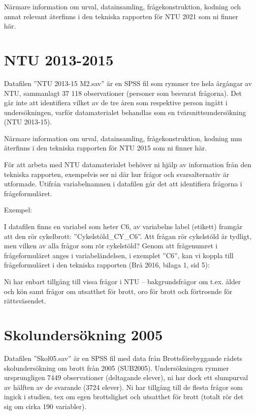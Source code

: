 \documentclass[
]{book}
\begin{document}
Närmare information om urval, datainsamling, frågekonstruktion, kodning och annat relevant återfinns i den
tekniska rapporten för NTU 2021 som ni finner här.

\hypertarget{ntu-2013-2015}{%
\section{NTU 2013-2015}\label{ntu-2013-2015}}

Datafilen ''NTU 2013-15 M2.sav'' är en SPSS fil som rymmer tre hela årgångar av NTU,
sammanlagt 37 118 observationer (personer som besvarat frågorna). Det går inte att identifiera
vilket av de tre åren som respektive person ingått i undersökningen, varför datamaterialet
behandlas som en tvärsnittsundersökning (NTU 2013-15).

Närmare information om urval, datainsamling, frågekonstruktion, kodning mm återfinns i den
tekniska rapporten för NTU 2015 som ni finner här.

För att arbeta med NTU datamaterialet behöver ni hjälp av information från den tekniska
rapporten, exempelvis ser ni där hur frågor och svarsalternativ är utformade.
Utifrån variabelnamnen i datafilen går det att identifiera frågorna i frågeformuläret.

Exempel:

I datafilen finns en variabel som heter C6, av variabelns label (etikett) framgår att den rör
cykelbrott: ''Cykelstöld\_CY\_C6''. Att frågan rör cykelstöld är tydligt, men vilken av alla frågor
som rör cykelstöld? Genom att frågenumret i frågeformuläret anges i variabeländelsen, i
exemplet ''C6'', kan vi koppla till frågeformuläret i den tekniska rapporten (Brå 2016, bilaga 1,
sid 5):

Ni har enbart tillgång till vissa frågor i NTU -- bakgrundsfrågor om t.ex. ålder och kön samt
frågor om utsatthet för brott, oro för brott och förtroende för rättsväsendet.

\hypertarget{skolundersuxf6kning-2005}{%
\section{Skolundersökning 2005}\label{skolundersuxf6kning-2005}}

Datafilen ''Skol05.sav'' är en SPSS fil med data från Brottsförebyggande rådets
skolundersökning om brott från 2005 (SUB2005). Undersökningen rymmer ursprungligen 7449
observationer (deltagande elever), ni har dock ett slumpurval av hälften av de svarande (3724
elever). Ni har tillgång till de flesta frågor som ingick i studien, tex om egen brottslighet och
utsatthet för brott (totalt rör det sig om cirka 190 variabler).
\end{document}
